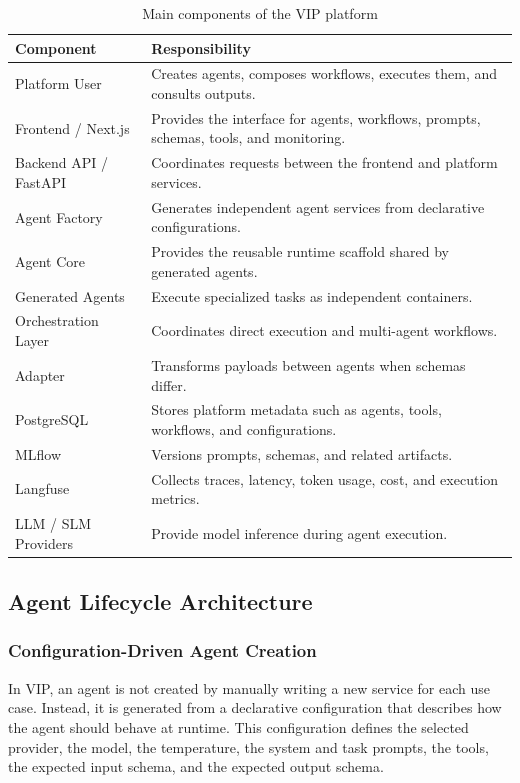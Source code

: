\begin{table}[H]
\centering
\small
\caption{Main components of the VIP platform}
\label{tab:vip_components}
\begin{tabular}{|p{4cm}|p{9cm}|}
\hline
\textbf{Component} & \textbf{Responsibility} \\
\hline
Platform User & Creates agents, composes workflows, executes them, and consults outputs. \\
\hline
Frontend / Next.js & Provides the interface for agents, workflows, prompts, schemas, tools, and monitoring. \\
\hline
Backend API / FastAPI & Coordinates requests between the frontend and platform services. \\
\hline
Agent Factory & Generates independent agent services from declarative configurations. \\
\hline
Agent Core & Provides the reusable runtime scaffold shared by generated agents. \\
\hline
Generated Agents & Execute specialized tasks as independent containers. \\
\hline
Orchestration Layer & Coordinates direct execution and multi-agent workflows. \\
\hline
Adapter & Transforms payloads between agents when schemas differ. \\
\hline
PostgreSQL & Stores platform metadata such as agents, tools, workflows, and configurations. \\
\hline
MLflow & Versions prompts, schemas, and related artifacts. \\
\hline
Langfuse & Collects traces, latency, token usage, cost, and execution metrics. \\
\hline
LLM / SLM Providers & Provide model inference during agent execution. \\
\hline
\end{tabular}
\end{table}

\subsection{Agent Lifecycle Architecture}

\subsubsection{Configuration-Driven Agent Creation}

In VIP, an agent is not created by manually writing a new service for each use case. Instead, it is generated from a declarative configuration that describes how the agent should behave at runtime. This configuration defines the selected provider, the model, the temperature, the system and task prompts, the tools, the expected input schema, and the expected output schema.

